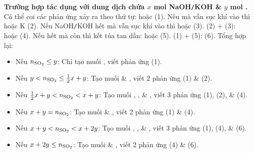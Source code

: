 \documentclass{article}
\begin{document}
\noindent\textbf{\textsf{Trường hợp  tác dụng với dung dịch chứa $x$ mol NaOH{\tt/}KOH \& $y$ mol .}} Có thể coi các phản ứng xảy ra theo thứ tự:  hoặc  (1). Nếu  mà vẫn sục khí  vào thì  hoặc K (2). Nếu NaOH{\tt/}KOH hết mà vẫn sục khí  vào thì  hoặc  (3). (2) $+$ (3):  hoặc  (4). Nếu  hết mà  còn thì kết tủa tan dần:  hoặc  (5). (1) $+$ (5):  (6). Tổng hợp lại:
\begin{itemize}
	\item Nếu $n_{\ce{SO2}}\le y$: Chỉ tạo muối , viết phản ứng (1).
	\item Nếu $y < n_{\ce{SO2}}\le\frac{1}{2}x + y$: Tạo muối  \& , viết 2 phản ứng (1) \& (2).
	\item Nếu $\frac{1}{2}x + y < n_{\ce{SO2}} < x + y$: Tạo muối , , \& , viết 3 phản ứng (1), (2), \& (4).
	\item Nếu $x + y = n_{\ce{SO2}}$: Tạo muối  \& , viết 2 phản ứng (1) \& (4).
	\item Nếu $x + y < n_{\ce{SO2}} < x + 2y$: Tạo muối , , \& , viết 3 phản ứng (1), (4), \& (6).
	\item Nếu $x + 2y\le n_{\ce{SO2}}$: Tạo muối  \& , viết 2 phản ứng (4) \& (6).
\end{itemize}

\end{document}
